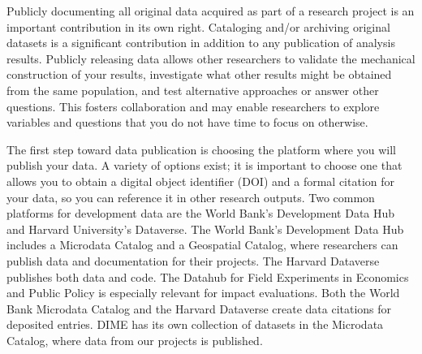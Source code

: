 Publicly documenting all original data acquired as part of a research project
is an important contribution in its own right.
Cataloging and/or archiving original datasets
is a significant contribution in addition to any publication of analysis results.
Publicly releasing data allows other researchers
to validate the mechanical construction of your results,
investigate what other results might be obtained from the same population,
and test alternative approaches or answer other questions.
This fosters collaboration and may enable researchers to explore variables and
questions that you do not have time to focus on otherwise.

The first step toward data publication is choosing the platform where you will publish your data.
A variety of options exist; 
it is important to choose one that allows you to obtain a digital object identifier (DOI)
and a formal citation for your data, so you can reference it in other research outputs.
Two common platforms for development data are the World Bank's Development Data Hub 
and Harvard University's Dataverse.
The World Bank's Development Data Hub
includes a Microdata Catalog
and a Geospatial Catalog,
where researchers can publish data and documentation for their projects.
The Harvard Dataverse
publishes both data and code.
The Datahub for Field Experiments in Economics and Public Policy
is especially relevant for impact evaluations.
Both the World Bank Microdata Catalog and the Harvard Dataverse
create data citations for deposited entries.
DIME has its own collection of datasets in the Microdata Catalog,
where data from our projects is published.

